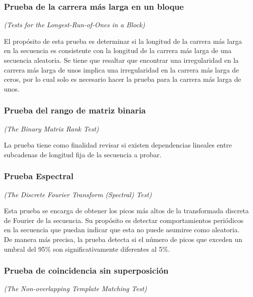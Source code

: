 

\subsubsection{Prueba de la carrera más larga en un bloque} %
\textit{(Tests for the Longest-Run-of-Ones in a Block)}

El propósito de esta prueba es determinar si la longitud de la carrera más
larga en la secuencia es consistente con la longitud de la carrera más larga
de una secuencia aleatoria. Se tiene que resaltar que encontrar una
irregularidad en la carrera más larga de unos implica una irregularidad en
la carrera más larga de ceros, por lo cual solo es necesario hacer la prueba
para la carrera más larga de unos.

\subsubsection{Prueba del rango de matriz binaria} %
\textit{(The Binary Matrix Rank Test)}


La prueba tiene como finalidad revisar si existen dependencias lineales entre
subcadenas de longitud fija de la secuencia a probar.

\subsubsection{Prueba Espectral} %
\textit{(The Discrete Fourier Transform (Spectral) Test)}

Esta prueba se encarga de obtener los picos más altos de la transformada
discreta de Fourier de la secuencia. Su propósito es detectar comportamientos
periódicos en la secuencia que puedan indicar que esta no puede asumirse como
aleatoria. De manera más precisa, la prueba detecta si el número de picos que
exceden un umbral del 95\% son significativamente diferentes al 5\%.

\subsubsection{Prueba de coincidencia sin superposición} %
\textit{(The Non-overlapping Template Matching Test)}

